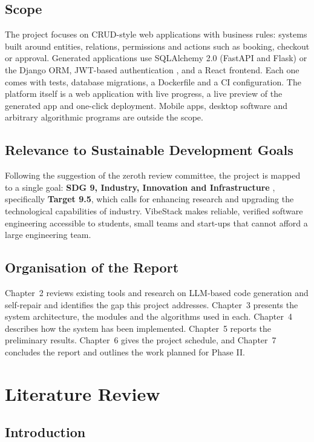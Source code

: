 \documentclass[12pt,a4paper]{report}
\begin{document}
\section{Scope}

The project focuses on CRUD-style web applications with business rules: systems built around entities, relations, permissions and actions such as booking, checkout or approval. Generated applications use SQLAlchemy 2.0 (FastAPI and Flask) or the Django ORM, JWT-based authentication \cite{rfc7519}, and a React frontend. Each one comes with tests, database migrations, a Dockerfile and a CI configuration. The platform itself is a web application with live progress, a live preview of the generated app and one-click deployment. Mobile apps, desktop software and arbitrary algorithmic programs are outside the scope.

\section{Relevance to Sustainable Development Goals}

Following the suggestion of the zeroth review committee, the project is mapped to a single goal: \textbf{SDG 9, Industry, Innovation and Infrastructure} \cite{un_sdg9}, specifically \textbf{Target 9.5}, which calls for enhancing research and upgrading the technological capabilities of industry. VibeStack makes reliable, verified software engineering accessible to students, small teams and start-ups that cannot afford a large engineering team.

\section{Organisation of the Report}

Chapter~2 reviews existing tools and research on LLM-based code generation and self-repair and identifies the gap this project addresses. Chapter~3 presents the system architecture, the modules and the algorithms used in each. Chapter~4 describes how the system has been implemented. Chapter~5 reports the preliminary results. Chapter~6 gives the project schedule, and Chapter~7 concludes the report and outlines the work planned for Phase II.

\chapter{Literature Review}
\section{Introduction}
\end{document}
